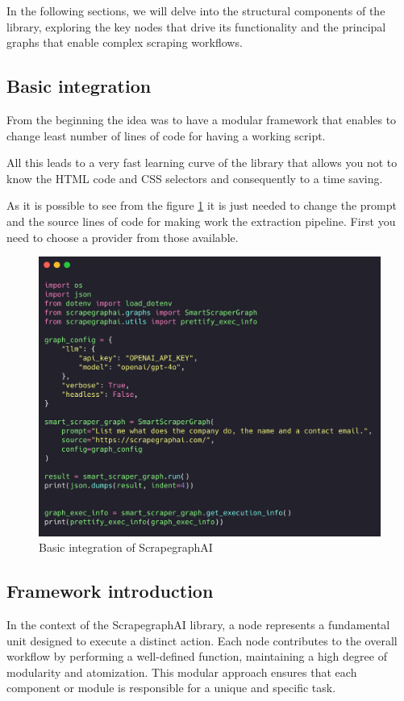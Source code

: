 In the following sections, we will delve into the structural components of the library, exploring the key nodes that drive its functionality and the principal graphs that enable complex scraping workflows.

\subsection{Basic integration}

From the beginning the idea was to have a modular framework that enables to change least number of lines of code for having a working script. 

All this leads to a very fast learning curve of the library that allows you not to know the HTML code and CSS selectors and consequently to a time saving.

As it is possible to see from the figure \ref{fig:scrapegraph-script} it is just needed to change the prompt and the source lines of code for making work the extraction pipeline. First you need to choose a provider from those available.

\begin{figure}[h!]
    \centering
    \includegraphics[width=0.75\linewidth]{Assets/scrapegraph_integration.png}
    \caption{Basic integration of ScrapegraphAI }
    \label{fig:scrapegraph-script}
\end{figure}

\subsection{Framework introduction}

In the context of the ScrapegraphAI  library, a node represents a fundamental unit designed to execute a distinct action. Each node contributes to the overall workflow by performing a well-defined function, maintaining a high degree of modularity and atomization. This modular approach ensures that each component or module is responsible for a unique and specific task.

